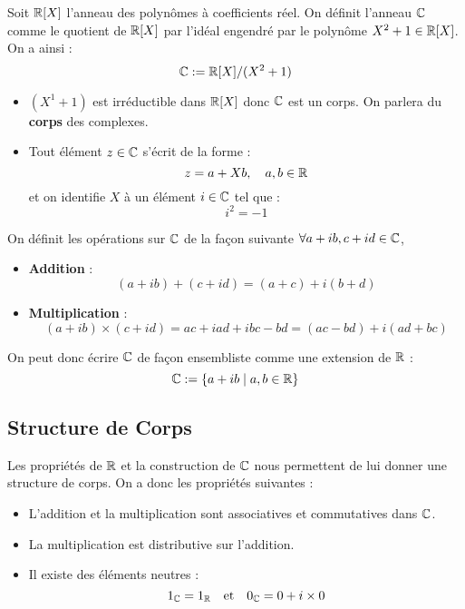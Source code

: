 \begin{definition}
    Soit $\mathbb{R}[X]$ l'anneau des polynômes à coefficients réel. On définit l'anneau $\mathbb{C}$ comme le quotient de $\mathbb{R}[X]$ par 
    l'idéal engendré par le polynôme $ X^2+1 \in \mathbb{R}[X]$. On a ainsi : 
        \[ \mathbb{C} := \mathbb{R}[X] / (X^2+1) \] 
    \begin{itemize}
        \item $(X^1 + 1)$ est irréductible dans $\mathbb{R}[X]$ donc $\mathbb{C}$ est un corps. 
        On parlera du \textbf{corps} des complexes. 
        \item Tout élément $z \in \mathbb{C}$ s'écrit de la forme : 
            \[ z = a + Xb, \quad a,b \in \mathbb{R} \] 
        et on identifie $X$ à un élément $ i \in \mathbb{C}$ tel que : 
            \[ i^2 = -1 \] 
    \end{itemize}
    On définit les opérations sur $\mathbb{C}$ de la façon suivante $ \forall a +ib, c+id \in \mathbb{C}$, 
    \begin{itemize}
        \item \textbf{Addition} : 
            \[ (a + ib) + (c + id) = (a+c) + i(b+d) \] 
        \item \textbf{Multiplication} : 
            \[ (a + ib) \times (c + id) = ac + iad + ibc - bd = (ac - bd) + i(ad + bc) \] 
    \end{itemize} 
    On peut donc écrire $\mathbb{C}$ de façon ensembliste comme une extension de $\mathbb{R}$ : 
        \[ \mathbb{C} := \{a + ib \; | \; a,b \in \mathbb{R}\} \] 
\end{definition}

\subsection{Structure de Corps}

\begin{proposition}
    Les propriétés de $\mathbb{R}$ et la construction de $\mathbb{C}$ nous permettent de lui donner une structure de corps. 
    On a donc les propriétés suivantes : 
    \begin{itemize}
        \item L'addition et la multiplication sont associatives et commutatives dans $\mathbb{C}$. 
        \item La multiplication est distributive sur l'addition. 
        \item Il existe des éléments neutres : 
            \[ 1_{\mathbb{C}} = 1_{\mathbb{R}} \quad \text{et} \quad 0_{\mathbb{C}} = 0 + i \times 0 \] 
    \end{itemize}
\end{proposition}

